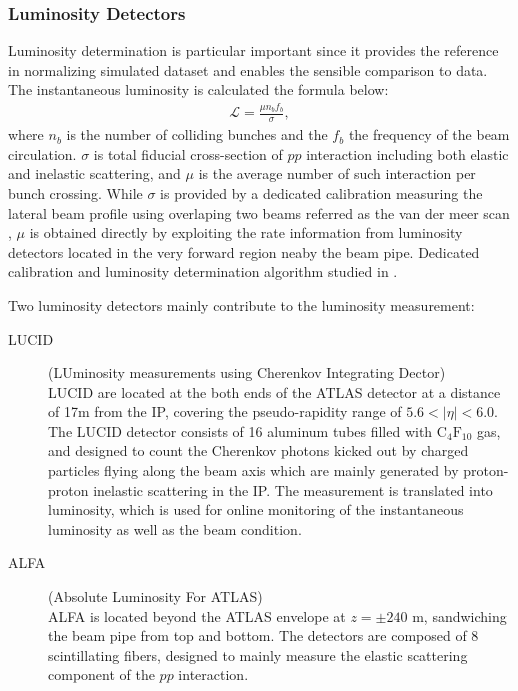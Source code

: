 \subsubsection{Luminosity Detectors}
Luminosity determination is particular important since it provides the reference in normalizing simulated dataset and enables the sensible comparison to data. 
The instantaneous luminosity is calculated the formula below:
\begin{align}
\mathcal{L} = \frac{\mu n_b f_b}{\sigma},
\end{align}
where $n_b$ is the number of colliding bunches and the $f_b$ the frequency of the beam circulation.
$\sigma$ is total fiducial cross-section of $pp$ interaction including both elastic and inelastic scattering, and $\mu$ is the average number of such interaction per bunch crossing. While $\sigma$ is provided by a dedicated calibration measuring the lateral beam profile using overlaping two beams referred as the van der meer scan \cite{VdMScan}, $\mu$ is obtained directly by exploiting the rate information from luminosity detectors located in the very forward region neaby the beam pipe. Dedicated calibration and luminosity determination algorithm studied in \cite{LumiMeasurement}.

Two luminosity detectors mainly contribute to the luminosity measurement:
\begin{description}

\item[LUCID] (LUminosity measurements using Cherenkov Integrating Dector) \\
LUCID are located at the both ends of the ATLAS detector at a distance of 17m from the IP, covering the pseudo-rapidity range of $5.6<|\eta|<6.0$.
The LUCID detector consists of 16 aluminum tubes filled with $\mathrm{C}_4 \mathrm{F}_{10}$ gas, 
and designed to count the Cherenkov photons kicked out by charged particles flying along the beam axis which are mainly generated by proton-proton inelastic scattering in the IP.
The measurement is translated into luminosity, which is used for online monitoring of the instantaneous luminosity as well as the beam condition. 



\item[ALFA] (Absolute Luminosity For ATLAS) \\
ALFA is located beyond the ATLAS envelope at $z=\pm 240$ m, sandwiching the beam pipe from top and bottom.
The detectors are composed of 8 scintillating fibers, designed to mainly measure the elastic scattering component of the $pp$ interaction.

\end{description}



